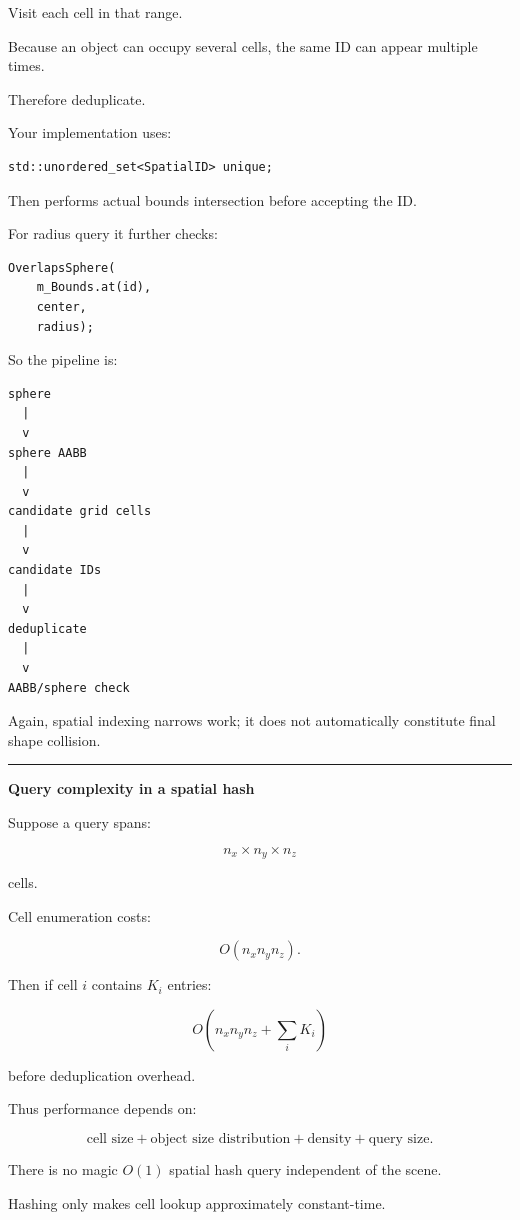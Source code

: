 Visit each cell in that range.

Because an object can occupy several cells, the same ID can appear multiple times.

Therefore deduplicate.

Your implementation uses:

\begin{verbatim}
std::unordered_set<SpatialID> unique;
\end{verbatim}

Then performs actual bounds intersection before accepting the ID.

For radius query it further checks:

\begin{verbatim}
OverlapsSphere(
    m_Bounds.at(id),
    center,
    radius);
\end{verbatim}

So the pipeline is:

\begin{verbatim}
sphere
  |
  v
sphere AABB
  |
  v
candidate grid cells
  |
  v
candidate IDs
  |
  v
deduplicate
  |
  v
AABB/sphere check
\end{verbatim}

Again, spatial indexing narrows work; it does not automatically constitute final shape collision.

\begin{center}\rule{0.5\linewidth}{0.5pt}\end{center}

\textbf{Query complexity in a spatial hash}

Suppose a query spans:

\[
n_x\times n_y\times n_z
\]

cells.

Cell enumeration costs:

\[
O(n_xn_yn_z).
\]

Then if cell \(i\) contains \(K_i\) entries:

\[
O\left(
n_xn_yn_z
+
\sum_iK_i
\right)
\]

before deduplication overhead.

Thus performance depends on:

\[
\boxed{
\text{cell size}
+
\text{object size distribution}
+
\text{density}
+
\text{query size}.
}
\]

There is no magic \(O(1)\) spatial hash query independent of the scene.

Hashing only makes cell lookup approximately constant-time.

